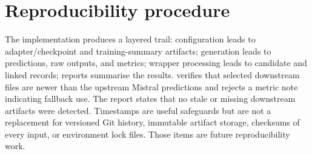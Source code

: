 \section{Reproducibility procedure}

The implementation produces a layered trail: configuration leads to adapter/checkpoint and training-summary artifacts; generation leads to predictions, raw outputs, and metrics; wrapper processing leads to candidate and linked records; reports summarise the results.  verifies that selected downstream files are newer than the upstream Mistral predictions and rejects a metric note indicating fallback use. The report states that no stale or missing downstream artifacts were detected. Timestamps are useful safeguards but are not a replacement for versioned Git history, immutable artifact storage, checksums of every input, or environment lock files. Those items are future reproducibility work.
